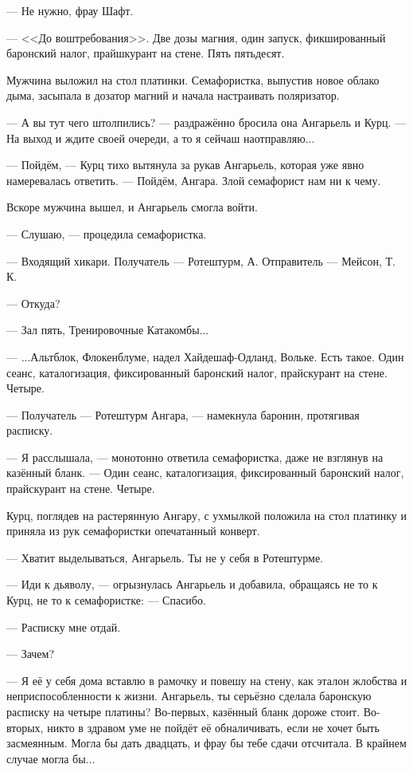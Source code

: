 --- Не нужно, фрау Шафт.

--- <<До воштребования>>.
Две дозы магния, один запуск, фикшированный баронский налог, прайшкурант на стене.
Пять пятьдесят.

Мужчина выложил на стол платинки.
Семафористка, выпустив новое облако дыма, засыпала в дозатор магний и начала настраивать поляризатор.

--- А вы тут чего штолпились? --- раздражённо бросила она Ангарьель и Курц.
--- На выход и ждите своей очереди, а то я сейчаш наотправляю...

--- Пойдём, --- Курц тихо вытянула за рукав Ангарьель, которая уже явно намеревалась ответить.
--- Пойдём, Ангара.
Злой семафорист нам ни к чему.

Вскоре мужчина вышел, и Ангарьель смогла войти.

--- Слушаю, --- процедила семафористка.

--- Входящий хикари.
Получатель --- Ротештурм, А.
Отправитель --- Мейсон, Т. К.

--- Откуда?

--- Зал пять, Тренировочные Катакомбы...

--- ...Альтблок, Флокенблуме, надел Хайдешаф-Одланд, Вольке.
Есть такое.
Один сеанс, каталогизация, фиксированный баронский налог, прайскурант на стене.
Четыре.

--- Получатель --- Ротештурм Ангара, --- намекнула баронин, протягивая расписку.

--- Я расслышала, --- монотонно ответила семафористка, даже не взглянув на казённый бланк.
--- Один сеанс, каталогизация, фиксированный баронский налог, прайскурант на стене.
Четыре.

Курц, поглядев на растерянную Ангару, с ухмылкой положила на стол платинку и приняла из рук семафористки опечатанный конверт.

--- Хватит выделываться, Ангарьель.
Ты не у себя в Ротештурме.

--- Иди к дьяволу, --- огрызнулась Ангарьель и добавила, обращаясь не то к Курц, не то к семафористке:
--- Спасибо.

--- Расписку мне отдай.

--- Зачем?

--- Я её у себя дома вставлю в рамочку и повешу на стену, как эталон жлобства и неприспособленности к жизни.
Ангарьель, ты серьёзно сделала баронскую расписку на четыре платины?
Во-первых, казённый бланк дороже стоит.
Во-вторых, никто в здравом уме не пойдёт её обналичивать, если не хочет быть засмеянным.
Могла бы дать двадцать, и фрау бы тебе сдачи отсчитала.
В крайнем случае могла бы...

